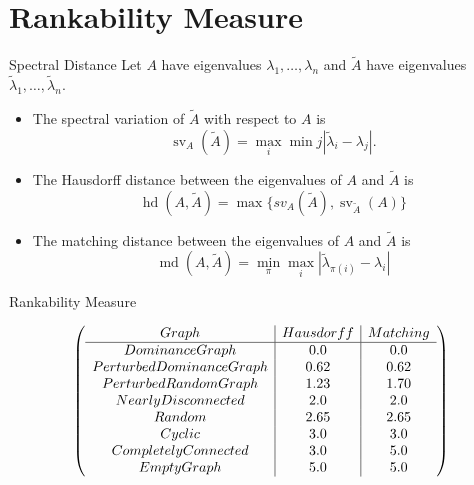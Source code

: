 \documentclass{beamer}
\DeclareMathOperator{\md}{md}
\DeclareMathOperator{\sv}{sv}
\DeclareMathOperator{\hd}{hd}
\newcommand\abs[1]{\left|#1\right|}
\begin{document}
\section{Rankability Measure}

\begin{frame}{Spectral Distance}
Let $A$ have eigenvalues $\lambda_{1},\ldots,\lambda_{n}$ and $\tilde{A}$ have eigenvalues $\tilde{\lambda}_{1},\ldots,\tilde{\lambda}_{n}$.
\vfill
\begin{itemize}
\item	The spectral variation of $\tilde{A}$ with respect to $A$ is
\[
\sv_{A}(\tilde{A})=\max_{i}\min{j}\abs{\tilde{\lambda}_{i}-\lambda_{j}}.
\]
\vfill
\item	The Hausdorff distance between the eigenvalues of $A$ and $\tilde{A}$ is
\[
\hd(A,\tilde{A})=\max\{sv_{A}(\tilde{A}),\sv_{\tilde{A}}(A)\}
\]
\vfill
\item	The matching distance between the eigenvalues of $A$ and $\tilde{A}$ is
\[
\md(A,\tilde{A})=\min_{\pi}\max_{i}\abs{\tilde{\lambda}_{\pi(i)}-\lambda_{i}}
\]
\end{itemize}
\vfill
\end{frame}

\begin{frame}{Rankability Measure}
\begin{example}
\[
\left(\begin{array}{c | c | c}
Graph & Hausdorff & Matching \\
\hline
Dominance Graph & 0.0 & 0.0 \\
Perturbed Dominance Graph & 0.62 & 0.62 \\
Perturbed Random Graph & 1.23 & 1.70 \\
Nearly Disconnected & 2.0 & 2.0 \\
Random & 2.65 & 2.65 \\
Cyclic & 3.0 & 3.0 \\
Completely Connected & 3.0 & 5.0 \\
Empty Graph & 5.0 & 5.0
\end{array}\right)
\]
\end{example}
\end{frame}


%
%
\end{document}
